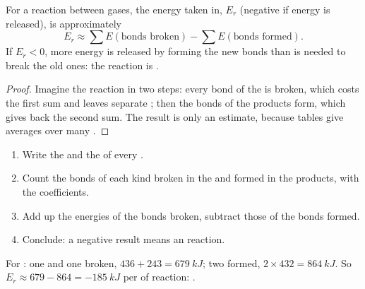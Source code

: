 \begin{proposition}\label{prop:g11:reaction-energy:estimate}
For a reaction between gases, the energy taken in, $E_r$ (negative if
energy is released), is approximately
\[
  E_r \approx \sum E(\text{bonds broken}) - \sum E(\text{bonds formed}) .
\]
If $E_r < 0$, more energy is released by forming the new bonds than is
needed to break the old ones: the reaction is .
\end{proposition}

\begin{proof}
Imagine the reaction in two steps: every bond of the  is broken,
which costs the first sum and leaves separate ; then the bonds of
the products form, which gives back the second sum. The result is only an
estimate, because tables give averages over many .
\end{proof}

\begin{method}\label{met:g11:reaction-energy:bonds}
\begin{enumerate}
  \item Write the  and the  of every
        .
  \item Count the bonds of each kind broken in the  and formed
        in the products, with the coefficients.
  \item Add up the energies of the bonds broken, subtract those of the
        bonds formed.
  \item Conclude: a negative result means an  reaction.
\end{enumerate}
\end{method}

\begin{example}\label{ex:g11:reaction-energy:hcl}
For : one  and one  broken,
$436 + 243 = \qty{679}{kJ}$; two  formed, $2 \times 432 =
\qty{864}{kJ}$. So $E_r \approx 679 - 864 = \qty{-185}{kJ}$ per  of
reaction: .
\end{example}


